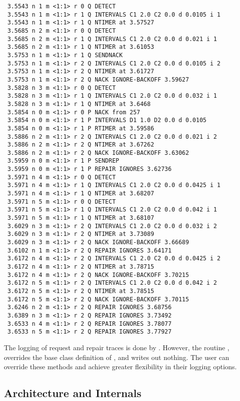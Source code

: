 \documentclass{article}
\begin{document}
\begin{verbatim}
 3.5543 n 1 m <1:1> r 0 Q DETECT
 3.5543 n 1 m <1:1> r 1 Q INTERVALS C1 2.0 C2 0.0 d 0.0105 i 1
 3.5543 n 1 m <1:1> r 1 Q NTIMER at 3.57527
 3.5685 n 2 m <1:1> r 0 Q DETECT
 3.5685 n 2 m <1:1> r 1 Q INTERVALS C1 2.0 C2 0.0 d 0.021 i 1
 3.5685 n 2 m <1:1> r 1 Q NTIMER at 3.61053
 3.5753 n 1 m <1:1> r 1 Q SENDNACK
 3.5753 n 1 m <1:1> r 2 Q INTERVALS C1 2.0 C2 0.0 d 0.0105 i 2
 3.5753 n 1 m <1:1> r 2 Q NTIMER at 3.61727
 3.5753 n 1 m <1:1> r 2 Q NACK IGNORE-BACKOFF 3.59627
 3.5828 n 3 m <1:1> r 0 Q DETECT
 3.5828 n 3 m <1:1> r 1 Q INTERVALS C1 2.0 C2 0.0 d 0.032 i 1
 3.5828 n 3 m <1:1> r 1 Q NTIMER at 3.6468
 3.5854 n 0 m <1:1> r 0 P NACK from 257
 3.5854 n 0 m <1:1> r 1 P INTERVALS D1 1.0 D2 0.0 d 0.0105
 3.5854 n 0 m <1:1> r 1 P RTIMER at 3.59586
 3.5886 n 2 m <1:1> r 2 Q INTERVALS C1 2.0 C2 0.0 d 0.021 i 2
 3.5886 n 2 m <1:1> r 2 Q NTIMER at 3.67262
 3.5886 n 2 m <1:1> r 2 Q NACK IGNORE-BACKOFF 3.63062
 3.5959 n 0 m <1:1> r 1 P SENDREP
 3.5959 n 0 m <1:1> r 1 P REPAIR IGNORES 3.62736
 3.5971 n 4 m <1:1> r 0 Q DETECT
 3.5971 n 4 m <1:1> r 1 Q INTERVALS C1 2.0 C2 0.0 d 0.0425 i 1
 3.5971 n 4 m <1:1> r 1 Q NTIMER at 3.68207
 3.5971 n 5 m <1:1> r 0 Q DETECT
 3.5971 n 5 m <1:1> r 1 Q INTERVALS C1 2.0 C2 0.0 d 0.042 i 1
 3.5971 n 5 m <1:1> r 1 Q NTIMER at 3.68107
 3.6029 n 3 m <1:1> r 2 Q INTERVALS C1 2.0 C2 0.0 d 0.032 i 2
 3.6029 n 3 m <1:1> r 2 Q NTIMER at 3.73089
 3.6029 n 3 m <1:1> r 2 Q NACK IGNORE-BACKOFF 3.66689
 3.6102 n 1 m <1:1> r 2 Q REPAIR IGNORES 3.64171
 3.6172 n 4 m <1:1> r 2 Q INTERVALS C1 2.0 C2 0.0 d 0.0425 i 2
 3.6172 n 4 m <1:1> r 2 Q NTIMER at 3.78715
 3.6172 n 4 m <1:1> r 2 Q NACK IGNORE-BACKOFF 3.70215
 3.6172 n 5 m <1:1> r 2 Q INTERVALS C1 2.0 C2 0.0 d 0.042 i 2
 3.6172 n 5 m <1:1> r 2 Q NTIMER at 3.78515
 3.6172 n 5 m <1:1> r 2 Q NACK IGNORE-BACKOFF 3.70115
 3.6246 n 2 m <1:1> r 2 Q REPAIR IGNORES 3.68756
 3.6389 n 3 m <1:1> r 2 Q REPAIR IGNORES 3.73492
 3.6533 n 4 m <1:1> r 2 Q REPAIR IGNORES 3.78077
 3.6533 n 5 m <1:1> r 2 Q REPAIR IGNORES 3.77927
\end{verbatim}


The logging of request and repair traces is done by
.
However, the routine
,
overrides the base class definition of ,
and writes out nothing.
The user can override these methods and achieve greater
flexibility in their logging options.

\subsection{Architecture and Internals}
\label{sec:architecture}
\end{document}
